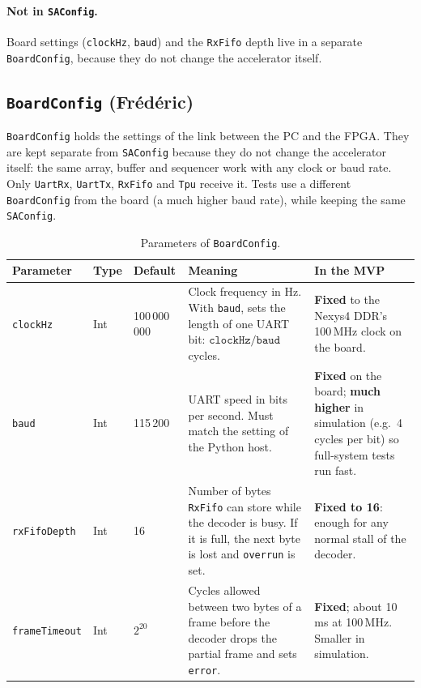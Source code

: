 \documentclass{article}
\begin{document}
\paragraph{Not in \texttt{SAConfig}.}
Board settings (\texttt{clockHz}, \texttt{baud}) and the \texttt{RxFifo} depth live in a separate \texttt{BoardConfig},
because they do not change the accelerator itself.


\subsection*{\texttt{BoardConfig} (Frédéric)}

\texttt{BoardConfig} holds the settings of the link between the PC and the FPGA. They are kept separate
from \texttt{SAConfig} because they do not change the accelerator itself: the same array, buffer and
sequencer work with any clock or baud rate. Only \texttt{UartRx}, \texttt{UartTx}, \texttt{RxFifo} and
\texttt{Tpu} receive it. Tests use a different \texttt{BoardConfig} from the board (a much higher baud
rate), while keeping the same \texttt{SAConfig}.

\begin{table}[htbp]
\small\renewcommand{\arraystretch}{1.25}
\begin{tabularx}{\linewidth}{@{} l l l Y Y @{}}
  \toprule
  \textbf{Parameter} & \textbf{Type} & \textbf{Default} & \textbf{Meaning} & \textbf{In the MVP} \\
  \midrule
  \texttt{clockHz}     & Int & 100\,000\,000 & Clock frequency in Hz. With \texttt{baud}, sets the length of one UART bit: $\texttt{clockHz}/\texttt{baud}$ cycles.
                       & \textbf{Fixed} to the Nexys4 DDR's 100\,MHz clock on the board. \\
  \texttt{baud}        & Int & 115\,200 & UART speed in bits per second. Must match the setting of the Python host.
                       & \textbf{Fixed} on the board; \textbf{much higher} in simulation (e.g.\ 4 cycles per bit) so full-system tests run fast. \\
  \texttt{rxFifoDepth} & Int & 16 & Number of bytes \texttt{RxFifo} can store while the decoder is busy. If it is full, the next byte is lost and \texttt{overrun} is set.
                       & \textbf{Fixed to 16}: enough for any normal stall of the decoder. \\
  \texttt{frameTimeout} & Int & $2^{20}$ & Cycles allowed between two bytes of a frame before the decoder drops the partial frame and sets \texttt{error}.
                       & \textbf{Fixed}; about 10\,ms at 100\,MHz. Smaller in simulation. \\
  \bottomrule
\end{tabularx}
\caption{Parameters of \texttt{BoardConfig}.}
\label{tab:board}
\end{table}
\end{document}
